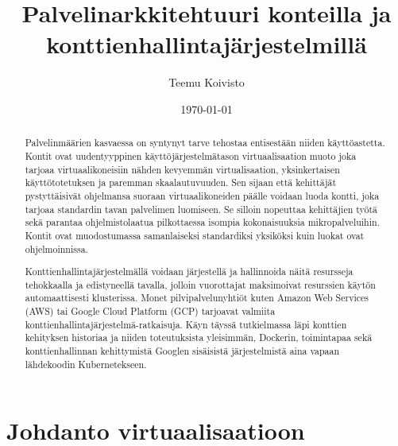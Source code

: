 \documentclass[finnish,gradu]{tktltiki3}
\begin{document}
\singlespacing

\title{Palvelinarkkitehtuuri konteilla ja konttienhallintajärjestelmillä}
\author{Teemu Koivisto}
\date{\today}

\maketitle





\begin{abstract}

Palvelinmäärien kasvaessa on syntynyt tarve tehostaa entisestään niiden käyttöastetta. Kontit ovat uudentyyppinen käyttöjärjestelmätason virtuaalisaation muoto joka tarjoaa virtuaalikoneisiin nähden kevyemmän virtualisaation, yksinkertaisen käyttötotetuksen ja paremman skaalautuvuuden. Sen sijaan että kehittäjät pystyttäisivät ohjelmansa suoraan virtuaalikoneiden päälle voidaan luoda kontti, joka tarjoaa standardin tavan palvelimen luomiseen. Se silloin nopeuttaa kehittäjien työtä sekä parantaa ohjelmistolaatua pilkottaessa isompia kokonaisuuksia mikropalveluihin. Kontit ovat muodostumassa samanlaiseksi standardiksi yksiköksi kuin luokat ovat ohjelmoinnissa.

Konttienhallintajärjestelmällä voidaan järjestellä ja hallinnoida näitä resursseja tehokkaalla ja edistyneellä tavalla, jolloin vuorottajat maksimoivat resurssien käytön automaattisesti klusterissa. Monet pilvipalvelunyhtiöt kuten Amazon Web Services (AWS) tai Google Cloud Platform (GCP) tarjoavat valmiita konttienhallintajärjestelmä-ratkaisuja. Käyn täyssä tutkielmassa läpi konttien kehityksen historiaa ja niiden toteutuksista yleisimmän, Dockerin, toimintapaa sekä konttienhallinnan kehittymistä Googlen sisäisistä järjestelmistä aina vapaan lähdekoodin Kubernetekseen.

\end{abstract}

\mytableofcontents

\section{Johdanto virtuaalisaatioon}
\end{document}
